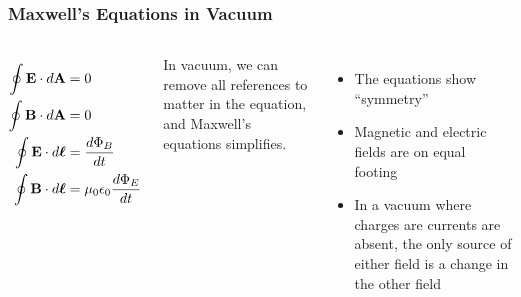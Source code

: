 \documentclass[12pt,aspectratio=169]{beamer}
\begin{document}
\begin{frame}
  \frametitle{Maxwell's Equations in Vacuum}
  \begin{columns}
    
    {\Large
      \begin{align*}
        \oint\mathbf{E}\cdot d\mathbf{A} &= 0 \\
        \oint\mathbf{B}\cdot d\mathbf{A} &= 0 \\
        \oint\mathbf{E}\cdot d\boldsymbol{\ell}&=\frac{d\Phi_B}{dt} \\
        \oint\mathbf{B}\cdot d\boldsymbol{\ell}&=\mu_0\epsilon_0\frac{d\Phi_E}{dt}\\
      \end{align*}
    }

    In vacuum, we can remove all references to matter in the equation, and
    Maxwell's equations simplifies.
    \begin{itemize}
    \item The equations show ``symmetry''
    \item Magnetic and electric fields are on equal footing
    \item In a vacuum where charges are currents are absent, the only source of
      either field is a change in the other field
    \end{itemize}
  \end{columns}
\end{frame}
\end{document}
